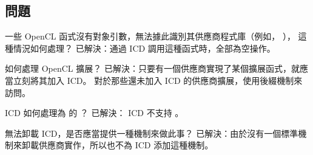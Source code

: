 \subsection{問題}

\startQUESTION
一些 OpenCL 函式沒有對象引數，無法據此識別其供應商程式庫（例如， ），
這種情況如何處理？
\stopQUESTION
\startANSWER
已解決：通過 ICD 調用這種函式時，全部為空操作。
\stopANSWER

\startQUESTION
如何處理 OpenCL 擴展？
\stopQUESTION
\startANSWER
已解決：只要有一個供應商實現了某個擴展函式，就應當立刻將其加入 ICD。
對於那些還未加入 ICD 的供應商擴展，使用後綴機制來訪問。
\stopANSWER

\startQUESTION
ICD 如何處理為  的 ？
\stopQUESTION
\startANSWER
已解決： ICD 不支持  。
\stopANSWER

\startQUESTION
無法卸載 ICD，是否應當提供一種機制來做此事？
\stopQUESTION
\startANSWER
已解決：由於沒有一個標準機制來卸載供應商實作，所以也不為 ICD 添加這種機制。
\stopANSWER

